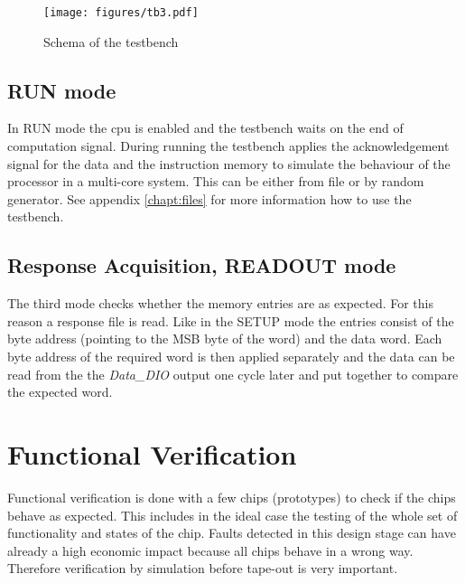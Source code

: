 \begin{landscape}
\begin{figure}[t!]

\centering
\texttt{[image: figures/tb3.pdf]}
\caption{Schema of the testbench}
\label{fig:testbenchSchema}
\end{figure}
\end{landscape}

\subsection{RUN mode}
In RUN mode the cpu is enabled and the testbench waits on the end of computation signal. During running the testbench applies the acknowledgement signal for the data and the instruction memory to simulate the behaviour of the processor in a multi-core system. This can be either from file or by random generator. See appendix \ref{chapt:files} for more information how to use the testbench.

\subsection{Response Acquisition, READOUT mode}
The third mode checks whether the memory entries are as expected. For this reason a response file is read. Like in the SETUP mode the entries consist of the byte address (pointing to the MSB byte of the word) and the data word. Each byte address of the required word is then applied separately and the data can be read from the the \textit{Data\_DIO} output one cycle later and put together to compare the expected word.


\section{Functional Verification}
Functional verification is done with a few chips (prototypes) to check if the chips behave as expected. This includes in the ideal case the testing of the whole set of functionality and states of the chip. Faults detected in this design stage can have already a high economic impact because all chips behave in a wrong way. Therefore verification by simulation before tape-out is very important.

